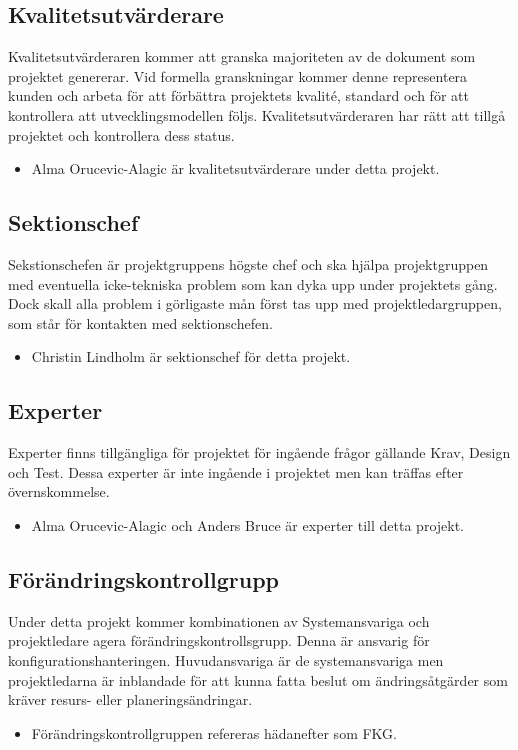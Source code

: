 \documentclass[paper=a4, fontsize=11pt,twoside]{article}
\begin{document}
\subsection*{Kvalitetsutvärderare}
Kvalitetsutvärderaren kommer att granska majoriteten av de dokument som projektet genererar. Vid formella granskningar kommer denne representera kunden och arbeta för att förbättra projektets kvalité, standard och för att kontrollera att utvecklingsmodellen följs. Kvalitetsutvärderaren har rätt att tillgå projektet och kontrollera dess status.
\begin{itemize}
\item Alma Orucevic-Alagic är kvalitetsutvärderare under detta projekt.
\end{itemize}

\subsection*{Sektionschef}
Sekstionschefen är projektgruppens högste chef och ska hjälpa projektgruppen med eventuella icke-tekniska problem som kan dyka upp under projektets gång. Dock skall alla problem i görligaste mån först tas upp med projektledargruppen, som står för kontakten med sektionschefen.
\begin{itemize}
\item Christin Lindholm är sektionschef för detta projekt.
\end{itemize}
		
	 
\subsection*{Experter}
Experter finns tillgängliga för projektet för ingående frågor gällande Krav, Design och Test. Dessa experter är inte ingående i projektet men kan träffas efter övernskommelse.
\begin{itemize}
\item Alma Orucevic-Alagic och Anders Bruce är experter till detta projekt. %
\end{itemize}
	

\subsection*{Förändringskontrollgrupp}
Under detta projekt kommer kombinationen av Systemansvariga och projektledare agera förändringskontrollsgrupp. Denna är ansvarig för konfigurationshanteringen. Huvudansvariga är de systemansvariga men projektledarna är inblandade för att kunna fatta beslut om ändringsåtgärder som kräver resurs- eller planeringsändringar.
\begin{itemize}
\item Förändringskontrollgruppen refereras hädanefter som FKG. 
\end{itemize}
		
\end{document}

